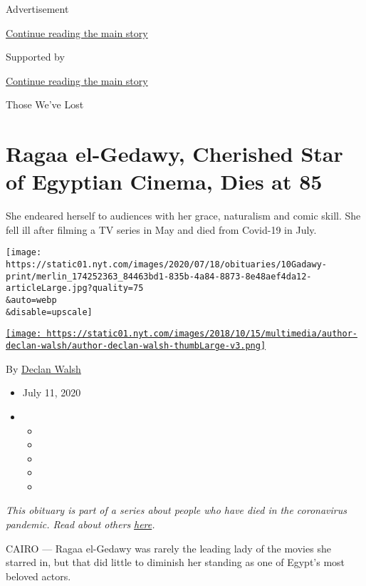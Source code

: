 Advertisement

\protect\hyperlink{after-top}{Continue reading the main story}

Supported by

\protect\hyperlink{after-sponsor}{Continue reading the main story}

Those We've Lost

\hypertarget{ragaa-el-gedawy-cherished-star-of-egyptian-cinema-dies-at-85}{%
\section{Ragaa el-Gedawy, Cherished Star of Egyptian Cinema, Dies at
85}\label{ragaa-el-gedawy-cherished-star-of-egyptian-cinema-dies-at-85}}

She endeared herself to audiences with her grace, naturalism and comic
skill. She fell ill after filming a TV series in May and died from
Covid-19 in July.

\texttt{[image: https://static01.nyt.com/images/2020/07/18/obituaries/10Gadawy-print/merlin\_174252363\_84463bd1-835b-4a84-8873-8e48aef4da12-articleLarge.jpg?quality=75\\\&auto=webp\\\&disable=upscale]}

\href{https://www.nytimes.com/by/declan-walsh}{\texttt{[image: https://static01.nyt.com/images/2018/10/15/multimedia/author-declan-walsh/author-declan-walsh-thumbLarge-v3.png]}}

By \href{https://www.nytimes.com/by/declan-walsh}{Declan Walsh}

\begin{itemize}
\item
  July 11, 2020
\item
  \begin{itemize}
  \item
  \item
  \item
  \item
  \item
  \end{itemize}
\end{itemize}

\emph{This obituary is part of a series about people who have died in
the coronavirus pandemic. Read about others}
\href{https://www.nytimes.com/interactive/2020/obituaries/people-died-coronavirus-obituaries.html}{\emph{here}}\emph{.}

CAIRO --- Ragaa el-Gedawy was rarely the leading lady of the movies she
starred in, but that did little to diminish her standing as one of
Egypt's most beloved actors.

